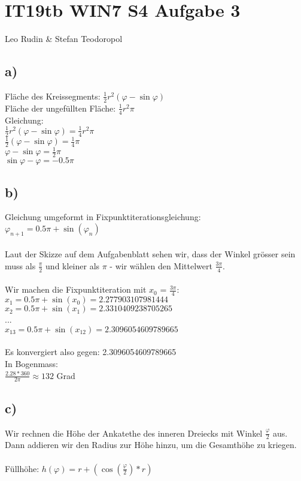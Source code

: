 \documentclass{article}
\begin{document}
\section*{IT19tb WIN7 S4 Aufgabe 3}
Leo Rudin \& Stefan Teodoropol

\subsection*{a)}

Fläche des Kreissegments: \( \frac{1}{2}r^2(\varphi - \sin\varphi) \)\\
Fläche der ungefüllten Fläche: \( \frac{1}{4}r^2\pi \)\\

Gleichung:\\
\( \frac{1}{2}r^2(\varphi - \sin\varphi) = \frac{1}{4}r^2\pi \)\\
\( \frac{1}{2}(\varphi - \sin\varphi) = \frac{1}{4}\pi \)\\
\( \varphi - \sin\varphi = \frac{1}{2}\pi \)\\
\(  \sin\varphi - \varphi = -0.5\pi \)\\

\subsection*{b)}

Gleichung umgeformt in Fixpunktiterationsgleichung:\\
\( \varphi_{n+1} = 0.5\pi + \sin(\varphi_n) \)\\\\
Laut der Skizze auf dem Aufgabenblatt sehen wir, dass der Winkel grösser sein muss als \( \frac{\pi}{2} \) und kleiner als \( \pi \) - wir wählen den Mittelwert \( \frac{3\pi}{4} \).\\\\
Wir machen die Fixpunktiteration mit \( x_0 \) = \( \frac{3\pi}{4} \):\\
\( x_1 = 0.5\pi + \sin(x_0) = 2.277903107981444 \)\\
\( x_2 = 0.5\pi + \sin(x_1) = 2.3310409238705265 \)\\
...\\
\( x_{13} = 0.5\pi + \sin(x_{12}) = 2.3096054609789665 \)\\\\
Es konvergiert also gegen: 2.3096054609789665\\
In Bogenmass:\\
\( \frac{2.28 * 360}{2\pi} \approx 132 \) Grad

\subsection*{c)}

Wir rechnen die Höhe der Ankatethe des inneren Dreiecks mit Winkel \( \frac{\varphi}{2} \) aus. Dann addieren wir den Radius zur Höhe hinzu, um die Gesamthöhe zu kriegen.\\\\
Füllhöhe: \( h(\varphi) = r + (\cos(\frac{\varphi}{2})*r) \)
\end{document}
